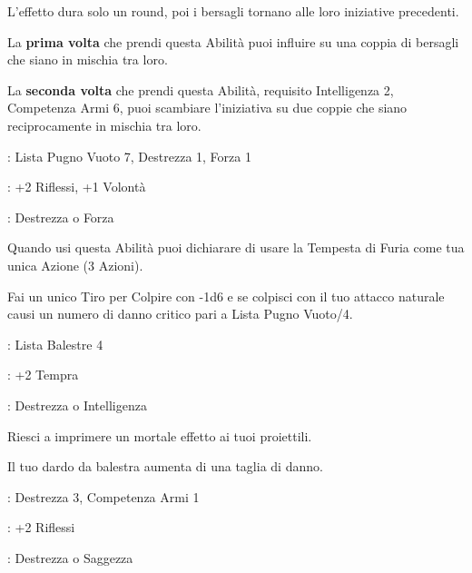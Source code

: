\begin{multicols}{2}
L'effetto dura solo un round, poi i bersagli tornano alle loro iniziative precedenti.

La \textbf{prima volta} che prendi questa Abilità puoi influire su una coppia di bersagli che siano in mischia tra loro.

La \textbf{seconda volta} che prendi questa Abilità, requisito Intelligenza 2, Competenza Armi 6, puoi scambiare l'iniziativa su due coppie che siano reciprocamente in mischia tra loro.

\begin{description}[noitemsep, topsep=0pt, parsep=0pt, partopsep=0pt, leftmargin=0cm, labelwidth=2.5cm]
    \item[\textbf{Requisito}]: Lista Pugno Vuoto 7, Destrezza 1, Forza 1
    \item[\textbf{Tiri Salvezza}]: +2 Riflessi, +1 Volontà
    \item[\textbf{Caratteristica}]: Destrezza o Forza
\end{description}

Quando usi questa Abilità puoi dichiarare di usare la Tempesta di Furia come tua unica Azione (3 Azioni).

Fai un unico Tiro per Colpire con -1d6 e se colpisci con il tuo attacco naturale causi un numero di danno critico pari a Lista Pugno Vuoto/4.

\begin{description}[noitemsep, topsep=0pt, parsep=0pt, partopsep=0pt, leftmargin=0cm, labelwidth=2.5cm]
    \item[\textbf{Requisito}]: Lista Balestre 4
    \item[\textbf{Tiri Salvezza}]: +2 Tempra
    \item[\textbf{Caratteristica}]: Destrezza o Intelligenza
\end{description}

Riesci a imprimere un mortale effetto ai tuoi proiettili.

Il tuo dardo da balestra aumenta di una taglia di danno.

\begin{description}[noitemsep, topsep=0pt, parsep=0pt, partopsep=0pt, leftmargin=0cm, labelwidth=2.5cm]
    \item[\textbf{Requisito}]: Destrezza 3, Competenza Armi 1
    \item[\textbf{Tiri Salvezza}]: +2 Riflessi
    \item[\textbf{Caratteristica}]: Destrezza o Saggezza
\end{description}


\end{multicols}
